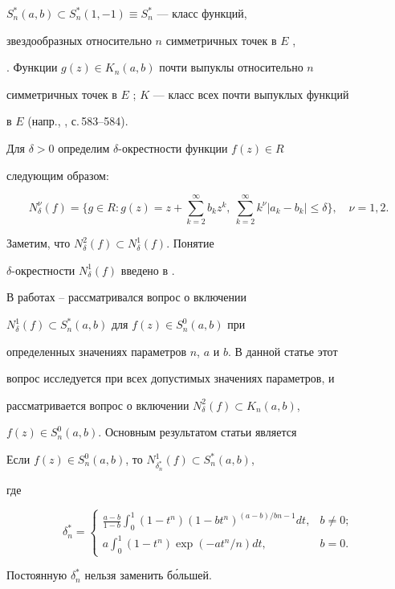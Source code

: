 $S^*_n(a,b)\subset S^*_n(1,-1)\equiv S^*_n$ --- класс функций, 


звездообразных относительно $n$ симметричных точек в $E$ \cite{2}, 


\cite{3}. Функции $g(z)\in K_n(a,b)$ почти выпуклы относительно $n$ 


симметричных точек в $E$ \cite{1}; $K$ --- класс всех почти выпуклых функций 


в $E$ (напр., \cite{4}, с.\,583--584). 


 


Для $\delta>0$ определим $\delta$-окрестности функции $f(z)\in R$ 


следующим образом: 


$$ 


N^\nu_\delta(f)=\bigg\{g\in R:g(z)=z+\sum^\infty_{k=2}b_k z^k,\  


\sum^\infty_{k=2}k^\nu|a_k-b_k|\le \delta\bigg\},\quad 


\nu=1,2. 


$$ 


Заметим, что $N^2_\delta(f)\subset N^1_\delta(f)$. Понятие 


$\delta$-окрестности $N^1_\delta(f)$ введено в \cite{5}. 


 


В работах \cite{5}--\cite{9} рассматривался вопрос о включении 


$N^1_\delta(f)\subset S^*_n(a,b)$ для $f(z)\in S^0_n(a,b)$ при 


определенных значениях параметров $n$, $a$ и $b$. В данной статье этот 


вопрос исследуется при всех допустимых значениях параметров, и 


рассматривается вопрос о включении $N^2_\delta(f)\subset K_n(a,b)$, 


$f(z)\in S^0_n(a,b)$. Основным результатом статьи является 


 


\begin{thm} 


Если $f(z)\in S^0_n(a,b)$, то $N^1_{\delta^*_n}(f)\subset S^*_n(a,b)$, 


где 


$$ 


\delta^*_n= 


\begin{cases} 


\displaystyle\frac{a-b}{1-b}\int^1_0(1-t^n) 


(1-bt^n)^{(a-b)/bn-1}dt, & b\ne 0;\\ 


\displaystyle a\int^1_0(1-t^n)\exp(-at^n/n)dt, & b=0. 


\end{cases} 


$$ 


Постоянную $\delta^*_n$ нельзя заменить б\'ольшей. 


\end{thm} 


